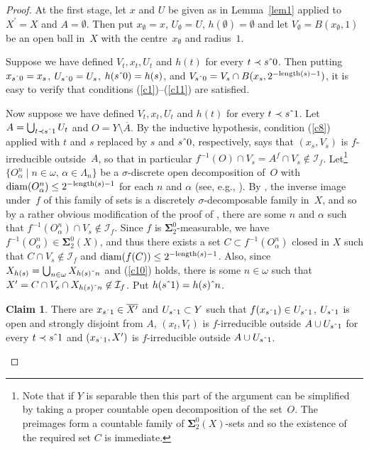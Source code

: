 \documentclass{raex}
\theoremstyle{plain}
\theoremstyle{definition}
\newtheorem*{claim}{Claim}
\theoremstyle{remark}
\def\S{\mathbf{\Sigma}}
\def\I{\mathcal{I}}
\def\conc{\hat{\hbox to .4em{}}}
\def\l{\textnormal{length}}
\def\diam{\operatorname{diam}}
\begin{document}
\begin{proof}
At the first stage, let $x$ and $U$ be given as in Lemma~\ref{lem1} applied to $X^\prime=X$ and $A=\emptyset$. Then put $x_\emptyset=x$, $U_\emptyset=U$, $h(\emptyset)=\emptyset$ and let $V_\emptyset=B(x_\emptyset,1)$ be an open ball in~$X$ with the centre~$x_\emptyset$ and radius~$1$.

Suppose we have defined $V_t,x_t,U_t$ and $h(t)$ for every $t\prec s\conc 0$. Then putting $x_{s\conc 0}=x_s$, $U_{s\conc 0}=U_s$, $h(s\conc 0)=h(s)$, and $V_{s\conc 0}=V_s\cap B(x_s,2^{-\l(s)-1})$, it is easy to verify that conditions (\ref{c1})--(\ref{c11}) are satisfied.

Now suppose we have defined $V_t,x_t,U_t$ and $h(t)$ for every $t\prec s\conc 1$. Let $A=\bigcup_{t\prec s\conc 1}U_t$ and $O=Y\setminus\overline{A}$. By the inductive hypothesis, condition (\ref{c8}) applied with $t$ and $s$ replaced by $s$ and $s \conc 0$, respectively, says that $(x_s,V_s)$ is $f$-irreducible outside~$A$, so that in particular $f^{-1}(O)\cap V_s = A^f \cap V_s \notin \I_f$. Let\footnote{Note that if $Y$ is separable then this part of the argument can be simplified by taking a proper countable open decomposition of the set~$O$. The preimages form a countable family of $\S^0_2(X)$-sets and so the existence of the required set $C$ is immediate.} \label{inductionstep} $\{O^n_\alpha \mid n\in\omega,\,\alpha\in\Lambda_n\}$ be a $\sigma$-discrete open decomposition of~$O$ with $\diam(O^n_\alpha)\le 2^{-\l(s)-1}$ for each $n$ and $\alpha$ (see, e.g., \cite[Theorem~4.4.3]{eng}). By \cite[Theorem~3]{jaynerogers}, the inverse image under~$f$ of this family of sets is a discretely $\sigma$-decomposable family in~$X$, and so by a rather obvious modification of the proof of \cite[Theorem~4]{jaynerogers}, there are some $n$ and $\alpha$ such that $f^{-1}(O^n_\alpha)\cap V_s\notin\I_f$. Since $f$ is $\S^0_2$-measurable, we have $f^{-1}(O^n_\alpha)\in\S^0_2(X)$, and thus there exists a set $C\subset f^{-1}(O^n_\alpha)$ closed in $X$ such that $C\cap V_s\not\in\I_f$ and $\diam(f(C))\le 2^{-\l(s)-1}$. Also, since $X_{h(s)}=\bigcup_{n\in\omega}X_{h(s)\conc n}$ and (\ref{c10}) holds, there is some $n\in\omega$ such that $X^\prime=C\cap V_s\cap X_{h(s)\conc n}\not\in\I_f$. Put $h(s\conc1)=h(s)\conc n$.

\begin{claim}
There are $x_{s\conc1}\in\overline{X^\prime}$ and $U_{s\conc1}\subset Y$ such that $f(x_{s\conc1})\in U_{s\conc1}$, $U_{s\conc1}$ is open and strongly disjoint from $A$, $(x_t,V_t)$ is $f$-irreducible outside $A\cup U_{s\conc1}$ for every $t\prec s\conc1$ and $(x_{s\conc1},X^\prime)$ is $f$-irreducible outside $A\cup U_{s\conc1}$.
\end{claim}


\end{proof}
\end{document}
